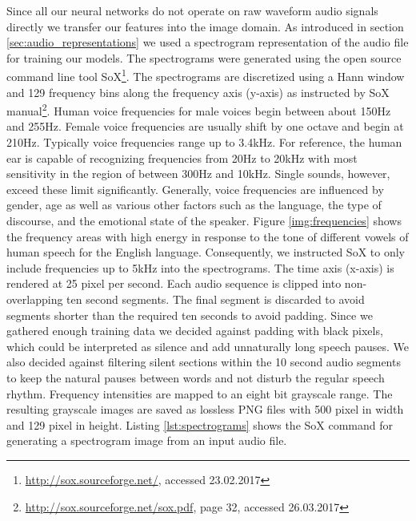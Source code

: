 	Since all our neural networks do not operate on raw waveform audio signals directly we transfer our features into the image domain. As introduced in section \ref{sec:audio_representations} we used a spectrogram representation of the audio file for training our models. The spectrograms were generated using the open source command line tool SoX\footnote{\url{http://sox.sourceforge.net/}, accessed 23.02.2017}. The spectrograms are discretized using a Hann window\cite{blackman1958measurement} and 129 frequency bins along the frequency axis (y-axis) as instructed by SoX manual\footnote{\url{http://sox.sourceforge.net/sox.pdf}, page 32, accessed 26.03.2017}. Human voice frequencies for male voices begin between about 150Hz and 255Hz\cite{traunmuller1993frequency}. Female voice frequencies are usually shift by one octave and begin at 210Hz. Typically voice frequencies range up to 3.4kHz. For reference, the human ear is capable of recognizing frequencies from 20Hz to 20kHz with most sensitivity in the region of between 300Hz and 10kHz. Single sounds, however, exceed these limit significantly. Generally, voice frequencies are influenced by gender, age as well as various other factors such as the language, the type of discourse, and the emotional state of the speaker. Figure \ref{img:frequencies} shows the frequency areas with high energy in response to the tone of different vowels of human speech for the English language. Consequently, we instructed SoX to only include frequencies up to 5kHz into the spectrograms. The time axis (x-axis) is rendered at 25 pixel per second. Each audio sequence is clipped into non-overlapping ten second segments. The final segment is discarded to avoid segments shorter than the required ten seconds to avoid padding. Since we gathered enough training data we decided against padding with black pixels, which could be interpreted as silence and add unnaturally long speech pauses. We also decided against filtering silent sections within the 10 second audio segments to keep the natural pauses between words and not disturb the regular speech rhythm. Frequency intensities are mapped to an eight bit grayscale range. The resulting grayscale images are saved as lossless PNG files with 500 pixel in width and 129 pixel in height. Listing \ref{lst:spectrograms} shows the SoX command for generating a spectrogram image from an input audio file.
	

